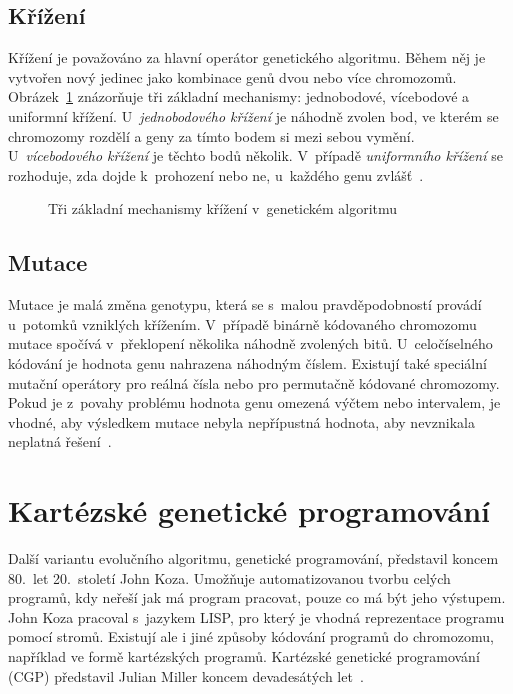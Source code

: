 \subsection{Křížení}

Křížení je považováno za hlavní operátor genetického algoritmu. Během něj je vytvořen nový jedinec jako kombinace genů dvou nebo více chromozomů. Obrázek~\ref{obrKrizeni} znázorňuje tři základní mechanismy: jednobodové, vícebodové a uniformní křížení. U~\emph{jednobodového křížení} je náhodně zvolen bod, ve kterém se chromozomy rozdělí a geny za tímto bodem si mezi sebou vymění. U~\emph{vícebodového křížení} je těchto bodů několik. V~případě \emph{uniformního křížení} se rozhoduje, zda dojde k~prohození nebo ne, u~každého genu zvlášť~\cite{Modra}.

\begin{figure}[htb]
    \centering
    \hskip1.5cm
    \hskip1.5cm
    \caption{Tři základní mechanismy křížení v~genetickém algoritmu}
    \label{obrKrizeni}
\end{figure}


\subsection{Mutace}

Mutace je malá změna genotypu, která se s~malou pravděpodobností provádí u~potomků vzniklých křížením. V~případě binárně kódovaného chromozomu mutace spočívá v~překlopení několika náhodně zvolených bitů. U~celočíselného kódování je hodnota genu nahrazena náhodným číslem. Existují také speciální mutační operátory pro reálná čísla nebo pro permutačně kódované chromozomy. Pokud je z~povahy problému hodnota genu omezená výčtem nebo intervalem, je vhodné, aby výsledkem mutace nebyla nepřípustná hodnota, aby nevznikala neplatná řešení~\cite{Modra}.

\section{Kartézské genetické programování}
\label{secCGP}

Další variantu evolučního algoritmu, genetické programování, představil koncem 80.~let 20.~století John Koza. Umožňuje automatizovanou tvorbu celých programů, kdy neřeší jak má program pracovat, pouze co má být jeho výstupem. John Koza pracoval s~jazykem LISP, pro který je vhodná reprezentace programu pomocí stromů. Existují ale i jiné způsoby kódování programů do chromozomu, například ve formě kartézských programů. Kartézské genetické programování (CGP) představil Julian Miller koncem devadesátých let~\cite{Miller2000}.

